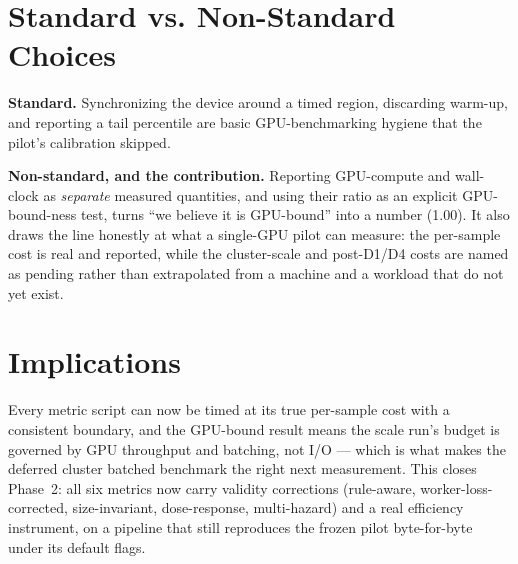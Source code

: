 \section{Standard vs. Non-Standard Choices}

\textbf{Standard.} Synchronizing the device around a timed region, discarding warm-up, and reporting a
tail percentile are basic GPU-benchmarking hygiene that the pilot's calibration skipped.

\textbf{Non-standard, and the contribution.} Reporting GPU-compute and wall-clock as \emph{separate}
measured quantities, and using their ratio as an explicit GPU-bound-ness test, turns ``we believe it is
GPU-bound'' into a number (1.00). It also draws the line honestly at what a single-GPU pilot can measure:
the per-sample cost is real and reported, while the cluster-scale and post-D1/D4 costs are named as
pending rather than extrapolated from a machine and a workload that do not yet exist.

\section{Implications}

Every metric script can now be timed at its true per-sample cost with a consistent boundary, and the
GPU-bound result means the scale run's budget is governed by GPU throughput and batching, not I/O ---
which is what makes the deferred cluster batched benchmark the right next measurement. This closes
Phase~2: all six metrics now carry validity corrections (rule-aware, worker-loss-corrected, size-invariant,
dose-response, multi-hazard) and a real efficiency instrument, on a pipeline that still reproduces the
frozen pilot byte-for-byte under its default flags.
